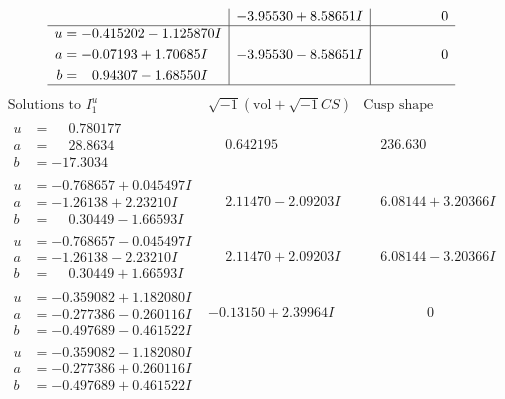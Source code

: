 \documentclass[1p]{elsarticle_modified}
\theoremstyle{definition}
\newcommand{\I}{\sqrt{-1}}
\begin{document}
$$\begin{array}{c|c|c}
 & -3.95530 + 8.58651 I & \phantom{-0.000000 } 0 \\ \hline\begin{aligned}
u &= -0.415202 - 1.125870 I \\
a &= -0.07193 + 1.70685 I \\
b &= \phantom{-}0.94307 - 1.68550 I\end{aligned}
 & -3.95530 - 8.58651 I & \phantom{-0.000000 } 0\\
 \hline 
 \end{array}$$\newpage$$\begin{array}{c|c|c}  
\text{Solutions to }I^u_{1}& \I (\text{vol} + \sqrt{-1}CS) & \text{Cusp shape}\\
 \hline 
\begin{aligned}
u &= \phantom{-}0.780177\phantom{ +0.000000I} \\
a &= \phantom{-}28.8634\phantom{ +0.000000I} \\
b &= -17.3034\phantom{ +0.000000I}\end{aligned}
 & \phantom{-}0.642195\phantom{ +0.000000I} & \phantom{-}236.630\phantom{ +0.000000I} \\ \hline\begin{aligned}
u &= -0.768657 + 0.045497 I \\
a &= -1.26138 + 2.23210 I \\
b &= \phantom{-}0.30449 - 1.66593 I\end{aligned}
 & \phantom{-}2.11470 - 2.09203 I & \phantom{-}6.08144 + 3.20366 I \\ \hline\begin{aligned}
u &= -0.768657 - 0.045497 I \\
a &= -1.26138 - 2.23210 I \\
b &= \phantom{-}0.30449 + 1.66593 I\end{aligned}
 & \phantom{-}2.11470 + 2.09203 I & \phantom{-}6.08144 - 3.20366 I \\ \hline\begin{aligned}
u &= -0.359082 + 1.182080 I \\
a &= -0.277386 - 0.260116 I \\
b &= -0.497689 - 0.461522 I\end{aligned}
 & -0.13150 + 2.39964 I & \phantom{-0.000000 } 0 \\ \hline\begin{aligned}
u &= -0.359082 - 1.182080 I \\
a &= -0.277386 + 0.260116 I \\
b &= -0.497689 + 0.461522 I\end{aligned}

\end{array}$$
\end{document}
